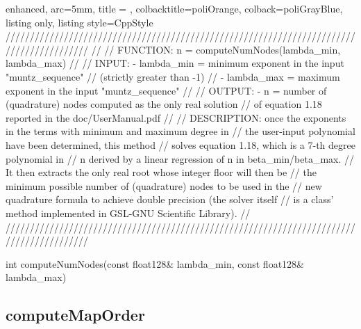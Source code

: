 \documentclass[a4paper, twosided]{book}
\begin{document}
\begin{tcblisting}{enhanced,
                   arc=5mm,
                   title = \color{black}{\large \ttfamily MonMap.cpp/computeNumNodes},
                   colbacktitle=poliOrange,
                   colback=poliGrayBlue,
                   listing only,
                   listing style=CppStyle}
/////////////////////////////////////////////////////////////////////////////////////////
//
//       FUNCTION: n = computeNumNodes(lambda_min, lambda_max)
//                
//          INPUT: - lambda_min = minimum exponent in the input "muntz_sequence" 
//                                (strictly greater than -1)
//                 - lambda_max = maximum exponent in the input "muntz_sequence"
//
//         OUTPUT: - n = number of (quadrature) nodes computed as the only real solution
//                       of equation 1.18 reported in the doc/UserManual.pdf
//
//    DESCRIPTION: once the exponents in the terms with minimum and maximum degree in
//                 the user-input polynomial have been determined, this method 
//                 solves equation 1.18, which is a 7-th degree polynomial in
//                 n derived by a linear regression of n in beta_min/beta_max. 
//                 It then extracts the only real root whose integer floor will then be 
//                 the minimum possible number of (quadrature) nodes to be used in the
//                 new quadrature formula to achieve double precision (the solver itself
//                 is a class' method implemented in GSL-GNU Scientific Library).
//
/////////////////////////////////////////////////////////////////////////////////////////

int computeNumNodes(const float128& lambda_min, const float128& lambda_max)
\end{tcblisting}

\newpage
\subsection[computeMapOrder]{\changefont computeMapOrder}\label{SubSec4.1.3}
\end{document}

